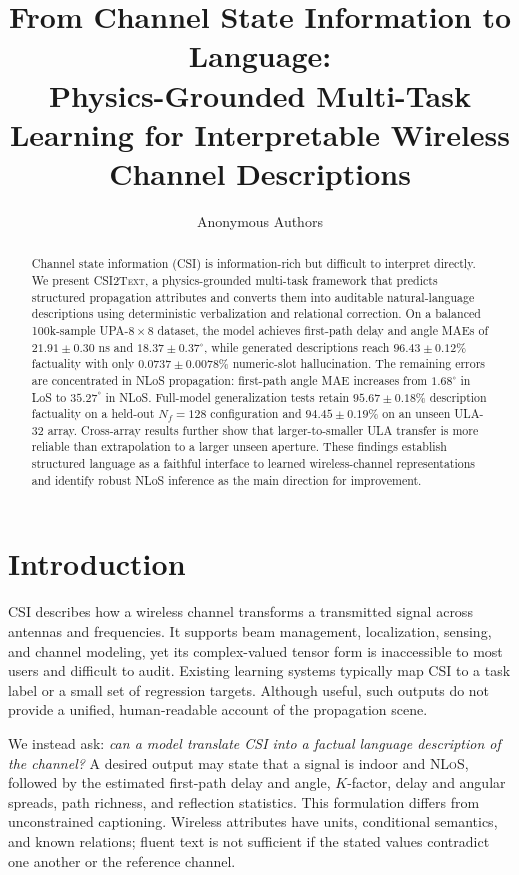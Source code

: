 \documentclass{article}
\title{From Channel State Information to Language:\\
Physics-Grounded Multi-Task Learning for Interpretable Wireless Channel Descriptions}
\author{Anonymous Authors}
\newcommand{\model}{\textsc{CSI2Text}}
\newcommand{\nlos}{\textsc{NLoS}}
\begin{document}
\maketitle

\begin{abstract}
Channel state information (CSI) is information-rich but difficult to interpret directly.
We present \model, a physics-grounded multi-task framework that predicts structured propagation attributes and converts them into auditable natural-language descriptions using deterministic verbalization and relational correction.
On a balanced 100k-sample UPA-$8{\times}8$ dataset, the model achieves first-path delay and angle MAEs of $21.91\pm0.30$ ns and $18.37\pm0.37^\circ$, while generated descriptions reach $96.43\pm0.12\%$ factuality with only $0.0737\pm0.0078\%$ numeric-slot hallucination.
The remaining errors are concentrated in NLoS propagation: first-path angle MAE increases from $1.68^\circ$ in LoS to $35.27^\circ$ in NLoS.
Full-model generalization tests retain $95.67\pm0.18\%$ description factuality on a held-out $N_f=128$ configuration and $94.45\pm0.19\%$ on an unseen ULA-32 array.
Cross-array results further show that larger-to-smaller ULA transfer is more reliable than extrapolation to a larger unseen aperture.
These findings establish structured language as a faithful interface to learned wireless-channel representations and identify robust NLoS inference as the main direction for improvement.
\end{abstract}

\section{Introduction}

CSI describes how a wireless channel transforms a transmitted signal across antennas and frequencies.
It supports beam management, localization, sensing, and channel modeling, yet its complex-valued tensor form is inaccessible to most users and difficult to audit.
Existing learning systems typically map CSI to a task label or a small set of regression targets.
Although useful, such outputs do not provide a unified, human-readable account of the propagation scene.

We instead ask: \emph{can a model translate CSI into a factual language description of the channel?}
A desired output may state that a signal is indoor and \nlos, followed by the estimated first-path delay and angle, $K$-factor, delay and angular spreads, path richness, and reflection statistics.
This formulation differs from unconstrained captioning.
Wireless attributes have units, conditional semantics, and known relations; fluent text is not sufficient if the stated values contradict one another or the reference channel.
\end{document}
